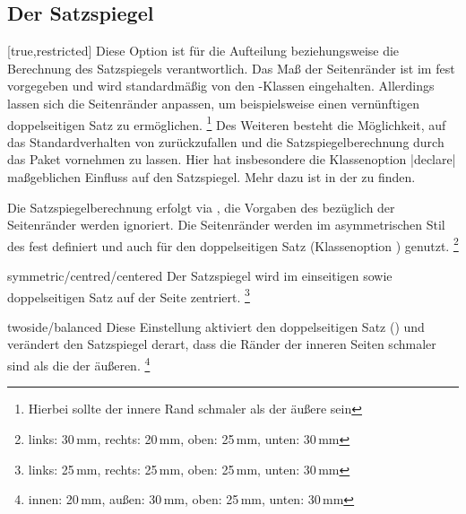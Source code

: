 \begin{Declaration*}{}
\begin{Declaration*}{}
\begin{Declaration*}{}
\subsection{Der Satzspiegel}
%
%
\begin{Declaration}[%
  v2.03;
  v2.05!\Option{cdgeometry=restricted};%
  v2.05!\Option{cdgeometry=adapted};%
  v2.05!\Option{cdgeometry=calculated};%
]{}[true,restricted]%
\printdeclarationlist%
%
%
%
Diese Option ist für die Aufteilung beziehungsweise die Berechnung des 
Satzspiegels verantwortlich. Das Maß der Seitenränder ist im \CD fest 
vorgegeben und wird standardmäßig von den \TUDScript-Klassen eingehalten. 
Allerdings lassen sich die Seitenränder anpassen, um beispielsweise einen 
vernünftigen doppelseitigen Satz zu ermöglichen.%
\footnote{Hierbei sollte der innere Rand schmaler als der äußere sein}
Des Weiteren besteht die Möglichkeit, auf das Standardverhalten von 
\KOMAScript{} zurückzufallen und die Satzspiegelberechnung durch das Paket
 vornehmen zu lassen. Hier hat insbesondere die Klassenoption 
|declare| maßgeblichen Einfluss auf den Satzspiegel. Mehr 
dazu ist in der  zu finden.
%
\begin{values}{}
\itemfalse
  Die Satzspiegelberechnung erfolgt via , die Vorgaben des 
  \CDs bezüglich der Seitenränder werden ignoriert.
\itemtrue*[asymmetric/cd]
  Die Seitenränder werden im asymmetrischen Stil des \CDs fest definiert und 
  auch für den doppelseitigen Satz (Klassenoption ) 
  genutzt.%
  \footnote{links: 30\,mm, rechts: 20\,mm, oben: 25\,mm, unten: 30\,mm}
\item[symmetric/centred/centered]
  Der Satzspiegel wird im einseitigen sowie doppelseitigen Satz auf der Seite 
  zentriert.%
  \footnote{links: 25\,mm, rechts: 25\,mm, oben: 25\,mm, unten: 30\,mm}
\item[twoside/balanced]
  Diese Einstellung aktiviert den doppelseitigen Satz () 
  und verändert den Satzspiegel derart, dass die Ränder der inneren Seiten 
  schmaler sind als die der äußeren.%
  \footnote{innen: 20\,mm, außen: 30\,mm, oben: 25\,mm, unten: 30\,mm}
\end{values}
\end{Declaration}
\end{Declaration*}
\end{Declaration*}
\end{Declaration*}

